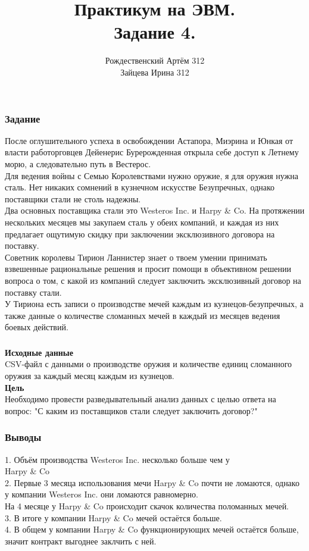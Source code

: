 \documentclass[8pt]{beamer}
\title{Практикум на ЭВМ.\\ Задание 4.}
\author{ Рождественский Артём 312\\ Зайцева Ирина 312\\}
\begin{document}
 
\frame{\titlepage}
 
\begin{frame}
\frametitle{Задание}
После оглушительного успеха в освобождении Астапора, Миэрина и Юнкая от власти работорговцев Дейенерис Бурерожденная открыла себе доступ к Летнему морю, а следовательно путь в Вестерос.\\
Для ведения войны с Семью Королевствами нужно оружие, я для оружия нужна сталь.
Нет никаких сомнений в кузнечном искусстве Безупречных, однако поставщики стали не столь надежны.\\
Два основных поставщика стали это {Westeros Inc.} и {Harpy \& Co}. На протяжении нескольких месяцев мы закупаем сталь у обеих компаний, и каждая из них предлагает ощутимую скидку при заключении эксклюзивного договора на поставку.\\
Советник королевы Тирион Ланнистер знает о твоем умении принимать взвешенные рациональные решения и просит помощи в объективном решении вопроса о том, с какой из компаний следует заключить эксклюзивный договор на поставку стали.\\
У Тириона есть записи о производстве мечей каждым из кузнецов-безупречных, а также данные о количестве сломанных мечей в каждый из месяцев ведения боевых действий.

\end{frame}

\begin{frame}
\frametitle{}
\LARGE
\textbf{Исходные данные}\\
\large
CSV-файл с данными о производстве оружия и количестве единиц сломанного оружия за каждый месяц каждым из кузнецов.\\
\vspace{\baselineskip}
\vspace{\baselineskip}
\LARGE
\textbf{Цель}\\
\large
Необходимо провести разведывательный анализ данных с целью ответа на вопрос: "С каким из поставщиков стали следует заключить договор?"

\end{frame}




\begin{frame}
\frametitle{Выводы}
\large
1. Объём производства {Westeros Inc.} несколько больше чем у\\ {Harpy \& Co}\\
\vspace{\baselineskip}
2. Первые 3 месяца использования мечи {Harpy \& Co} почти не ломаются, однако у компании {Westeros Inc.} они ломаются равномерно.\\
На 4 месяце у {Harpy \& Co} происходит скачок количества поломанных мечей.\\
\vspace{\baselineskip}
3. В итоге у компании {Harpy \& Co} мечей остаётся больше.\\
\vspace{\baselineskip}
4. В общем у компании {Harpy \& Co} функционирующих мечей остаётся больше, значит контракт выгоднее заклчить с ней. \\
\end{frame}
\end{document}
